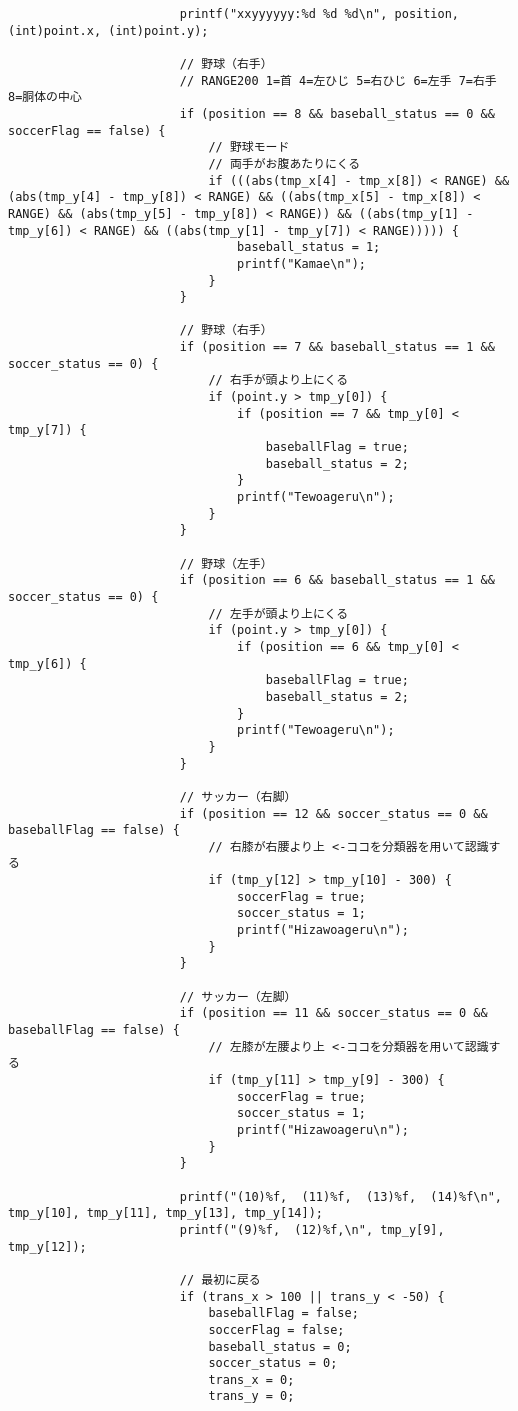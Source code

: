 \begin{lstlisting}
						printf("xxyyyyyy:%d %d %d\n", position, (int)point.x, (int)point.y);

						// 野球（右手）
						// RANGE200 1=首 4=左ひじ 5=右ひじ 6=左手 7=右手 8=胴体の中心
						if (position == 8 && baseball_status == 0 && soccerFlag == false) {
                            // 野球モード
                            // 両手がお腹あたりにくる
							if (((abs(tmp_x[4] - tmp_x[8]) < RANGE) && (abs(tmp_y[4] - tmp_y[8]) < RANGE) && ((abs(tmp_x[5] - tmp_x[8]) < RANGE) && (abs(tmp_y[5] - tmp_y[8]) < RANGE)) && ((abs(tmp_y[1] - tmp_y[6]) < RANGE) && ((abs(tmp_y[1] - tmp_y[7]) < RANGE))))) {  
								baseball_status = 1;
								printf("Kamae\n");
							}
						}

						// 野球（右手）
						if (position == 7 && baseball_status == 1 && soccer_status == 0) {
							// 右手が頭より上にくる
							if (point.y > tmp_y[0]) {
								if (position == 7 && tmp_y[0] < tmp_y[7]) {
									baseballFlag = true;
									baseball_status = 2;
								}
								printf("Tewoageru\n");
							}
						}

						// 野球（左手）
						if (position == 6 && baseball_status == 1 && soccer_status == 0) {
							// 左手が頭より上にくる
							if (point.y > tmp_y[0]) {
								if (position == 6 && tmp_y[0] < tmp_y[6]) {
									baseballFlag = true;
									baseball_status = 2;
								}
								printf("Tewoageru\n");
							}
						}

						// サッカー（右脚）
						if (position == 12 && soccer_status == 0 && baseballFlag == false) {
							// 右膝が右腰より上 <-ココを分類器を用いて認識する
							if (tmp_y[12] > tmp_y[10] - 300) {
								soccerFlag = true;
								soccer_status = 1;
								printf("Hizawoageru\n");
							}
						}

						// サッカー（左脚）
						if (position == 11 && soccer_status == 0 && baseballFlag == false) {
							// 左膝が左腰より上 <-ココを分類器を用いて認識する
							if (tmp_y[11] > tmp_y[9] - 300) {
								soccerFlag = true;
								soccer_status = 1;
								printf("Hizawoageru\n");
							}
						}

						printf("(10)%f,  (11)%f,  (13)%f,  (14)%f\n", tmp_y[10], tmp_y[11], tmp_y[13], tmp_y[14]);
						printf("(9)%f,  (12)%f,\n", tmp_y[9], tmp_y[12]);

						// 最初に戻る
						if (trans_x > 100 || trans_y < -50) {
							baseballFlag = false;
							soccerFlag = false;
							baseball_status = 0;
							soccer_status = 0;
							trans_x = 0;
							trans_y = 0;


\end{lstlisting}
